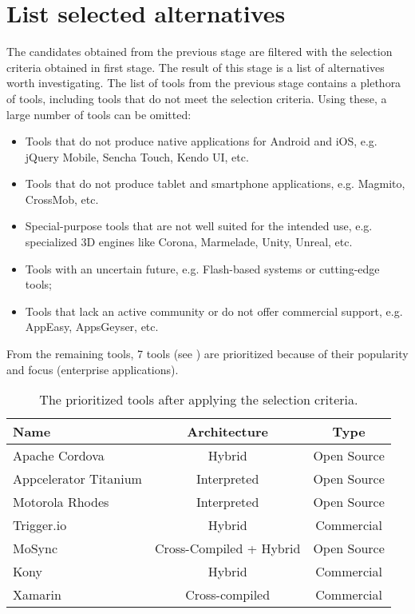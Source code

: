 \section{List selected alternatives}

The candidates obtained from the previous stage are filtered with the selection criteria obtained in first stage. The result of this stage is a list of alternatives worth investigating. The list of tools from the previous stage contains a plethora of tools, including tools that do not meet the selection criteria. Using these, a large number of tools can be omitted:

\begin{itemize}
    \item Tools that do not produce native applications for Android and iOS, e.g. jQuery Mobile, Sencha Touch, Kendo UI, etc.
    \item Tools that do not produce tablet and smartphone applications, e.g. Magmito, CrossMob, etc.
    \item Special-purpose tools that are not well suited for the intended use, e.g. specialized 3D engines like Corona, Marmelade, Unity, Unreal, etc.
    \item Tools with an uncertain future, e.g. Flash-based systems or cutting-edge tools;
    \item Tools that lack an active community or do not offer commercial support, e.g. AppEasy, AppsGeyser, etc. 
\end{itemize}

From the remaining tools, 7 tools (see ) are prioritized because of their popularity and focus (enterprise applications).

\begin{table}[h!]
    \begin{center}
        \begin{tabular}{lcc}
            \hline
            Name                  & Architecture            & Type        \\
            \hline 
            Apache Cordova        & Hybrid                  & Open Source \\
            Appcelerator Titanium & Interpreted             & Open Source \\
            Motorola Rhodes       & Interpreted             & Open Source \\
            Trigger.io            & Hybrid                  & Commercial  \\
            MoSync                & Cross-Compiled + Hybrid & Open Source \\
            Kony                  & Hybrid                  & Commercial  \\
            Xamarin               & Cross-compiled          & Commercial  \\
            \hline
        \end{tabular}
        \caption{The prioritized tools after applying the selection criteria.}
        \label{tab:tools}
    \end{center}
\end{table}

